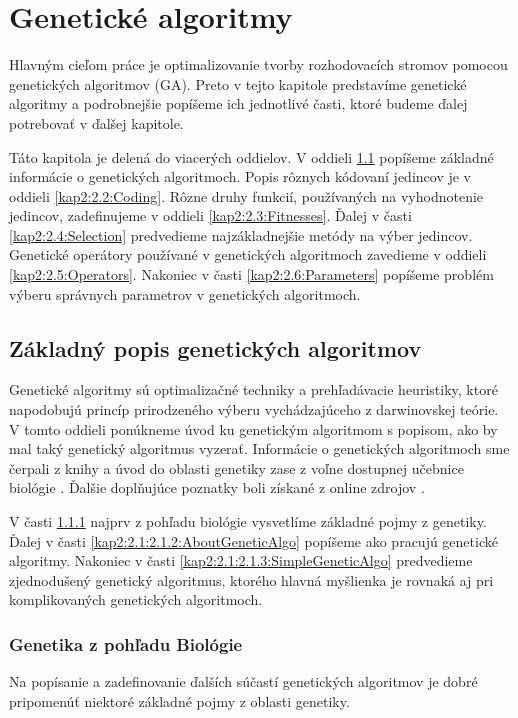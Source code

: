\chapter{Genetické algoritmy}
Hlavným cieľom práce je optimalizovanie tvorby rozhodovacích stromov pomocou genetických algoritmov (GA). Preto 
v tejto kapitole predstavíme genetické algoritmy a podrobnejšie popíšeme ich jednotlivé časti, ktoré budeme ďalej potrebovať v ďalšej kapitole.

Táto kapitola je delená do viacerých oddielov. V oddieli \ref{kap2:2.1:Info} popíšeme základné informácie o genetických algoritmoch. Popis rôznych kódovaní jedincov je v oddieli \ref{kap2:2.2:Coding}. Rôzne druhy funkcií, používaných na vyhodnotenie jedincov, zadefinujeme v oddieli \ref{kap2:2.3:Fitnesses}. Ďalej v časti \ref{kap2:2.4:Selection} predvedieme najzákladnejšie metódy na výber jedincov. Genetické operátory používané v genetických algoritmoch zavedieme v oddieli \ref{kap2:2.5:Operators}. Nakoniec v časti \ref{kap2:2.6:Parameters} popíšeme problém výberu správnych parametrov v genetických algoritmoch.

\section{Základný popis genetických algoritmov}\label{kap2:2.1:Info}
Genetické algoritmy sú optimalizačné techniky a prehľadávacie heuristiky, ktoré napodobujú princíp prirodzeného výberu vychádzajúceho z darwinovskej teórie. V tomto oddieli ponúkneme úvod ku genetickým algoritmom s popisom, ako by mal taký genetický algoritmus vyzerať. Informácie o genetických algoritmoch sme čerpali z knihy \cite{kap2-evolution} a úvod do oblasti genetiky zase z voľne dostupnej učebnice biológie \cite{online-biology}. Ďalšie doplňujúce poznatky boli získané z online zdrojov \cite{wiki-evolution,wiki-genetics,online-geneticsoverview}.

V časti \ref{kap2:2.1:2.1.1:Genetics} najprv z pohľadu biológie vysvetlíme základné pojmy z genetiky. Ďalej v časti \ref{kap2:2.1:2.1.2:AboutGeneticAlgo} popíšeme ako pracujú genetické algoritmy. Nakoniec v časti \ref{kap2:2.1:2.1.3:SimpleGeneticAlgo} predvedieme zjednodušený genetický algoritmus, ktorého hlavná myšlienka je rovnaká aj pri komplikovaných genetických algoritmoch.

\subsection{Genetika z pohľadu Biológie}\label{kap2:2.1:2.1.1:Genetics}
Na popísanie a zadefinovanie ďalších súčastí genetických algoritmov je dobré pripomenúť niektoré základné pojmy z oblasti genetiky. 

